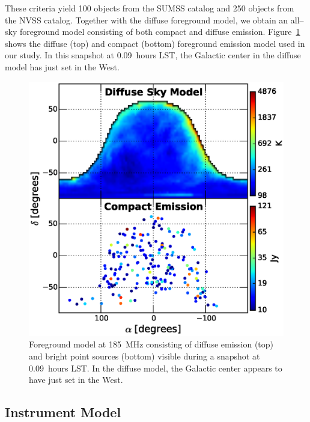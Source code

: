\documentclass[preprint2,iop,numberedappendix]{emulateapj}
\begin{document}
These criteria yield 100 objects from the SUMSS catalog and 250 objects from the NVSS catalog. Together with the diffuse foreground model, we obtain an all--sky foreground model consisting of both compact and diffuse emission. Figure~\ref{fig:sky-model-generic} shows the diffuse (top) and compact (bottom) foreground emission model used in our study. In this snapshot at 0.09~hours LST, the Galactic center in the diffuse model has just set in the West. 

\begin{figure}[htb]
\centering
\includegraphics[width=\linewidth]{figure4.eps}
\caption{Foreground model at 185~MHz consisting of diffuse emission (top) and bright point sources (bottom) visible during a snapshot at 0.09~hours LST. In the diffuse model, the Galactic center appears to have just set in the West. \label{fig:sky-model-generic}}
\end{figure}

\subsection{Instrument Model}\label{sec:instrument_model}
\end{document}
